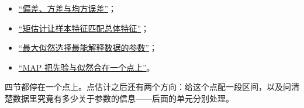 \begin{itemize}
\tightlist
\item \hyperref[sec:11-Mathematical-Statistics/02-Point-Estimation/01]{``偏差、方差与均方误差''}；
\item \hyperref[sec:11-Mathematical-Statistics/02-Point-Estimation/02]{``矩估计让样本特征匹配总体特征''}；
\item \hyperref[sec:11-Mathematical-Statistics/02-Point-Estimation/03]{``最大似然选择最能解释数据的参数''}；
\item \hyperref[sec:11-Mathematical-Statistics/02-Point-Estimation/04]{``MAP 把先验与似然合在一个点上''}。
\end{itemize}

四节都停在一个点上。点估计之后还有两个方向：给这个点配一段区间，以及问清楚数据里究竟有多少关于参数的信息——后面的单元分别处理。
